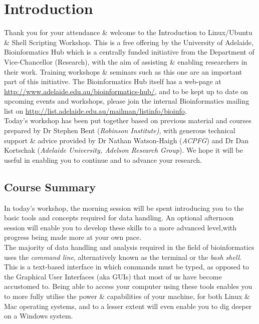 \documentclass[a4paper,12pt,twoside]{memoir}
\begin{document}
%
%
\workshoptitlepage

\chapter{Introduction}

Thank you for your attendance \& welcome to the Introduction to Linux/Ubuntu \& Shell Scripting Workshop.
This is a free offering by the University of Adelaide, Bioinformatics Hub which is a centrally funded initiative from the Department of Vice-Chancellor (Research), with the aim of assisting \& enabling researchers in their work.
Training workshops \& seminars such as this one  are an important part of this initiative. 
The Bioinformatics Hub itself has a web-page at \url{http://www.adelaide.edu.au/bioinformatics-hub/}, and to be kept up to date on upcoming events and workshops, please join the internal Bioinformatics mailing list on \url{http://list.adelaide.edu.au/mailman/listinfo/bioinfo}.\\

Today's workshop has been put together based on previous material and courses prepared by Dr Stephen Bent (\textit{Robinson Institute)}, with generous technical support \& advice provided by Dr Nathan Watson-Haigh (\textit{ACPFG}) and Dr Dan Kortschak (\textit{Adelaide University, Adelson Research Group}). 
We hope it will be useful in enabling you to continue and to advance your research.\\

\section{Course Summary}
In today's workshop, the morning session will be spent introducing you to the basic tools and concepts required for data handling.
An optional afternoon session will enable you to develop these skills to a more advanced level,with progress being made more at your own pace.\\

The majority of data handling and analysis required in the field of bioinformatics uses the \textit{command line}, alternatively known as the terminal or the \textit{bash shell}.
This is a text-based interface in which commands must be typed, as opposed to the Graphical User Interfaces (aka GUIs) that most of us have become accustomed to.
Being able to access your computer using these tools enables you to more fully utilise the power \& capabilities of your machine, for both Linux \& Mac operating systems, and to a lesser extent will even enable you to dig deeper on a Windows system.\\
\end{document}
